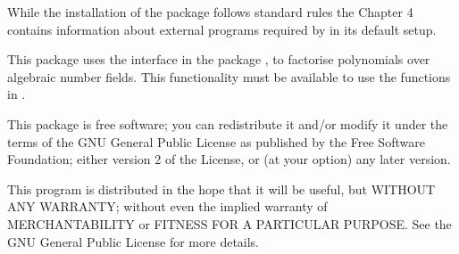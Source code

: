While the installation of the package follows standard {\GAP} rules
the Chapter 4 contains information about external programs required by
{\Radiroot} in its default setup.


This package uses the interface in the package \Alnuth, to
factorise polynomials over algebraic number fields. This functionality must
be available to use the functions in {\Radiroot}.  


This package is free software; you can redistribute it and/or modify
it under the terms of the GNU General Public License as published by
the Free Software Foundation; either version 2 of the License,
or (at your option) any later version.

This program is distributed in the hope that it will be useful, but
WITHOUT ANY WARRANTY; without even the implied warranty of
MERCHANTABILITY or FITNESS FOR A PARTICULAR PURPOSE. See the GNU
General Public License for more details.

